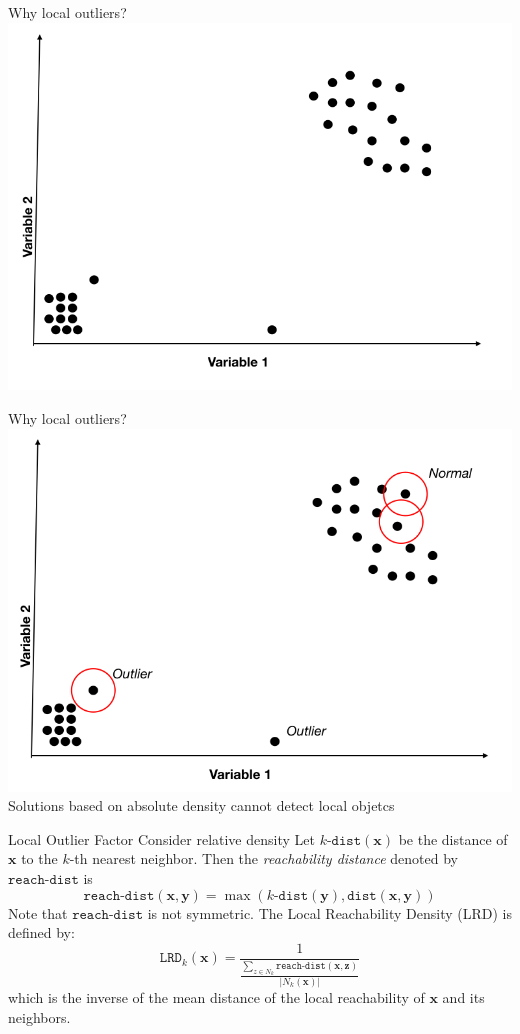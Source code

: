 \documentclass[10pt]{beamer}
\def\x{{\mathbf {x}}}
\newcommand{\vectorI}{\x}
\begin{document}
 





\begin{frame}{Why local outliers?}
\includegraphics[width=.75\textwidth]{NaiveOutlier}
\end{frame}

\begin{frame}{Why local outliers?}
\includegraphics[width=.75\textwidth]{NaiveOutlier2}
\\
\alert{Solutions based on absolute density cannot detect local objetcs}
\end{frame}

\begin{frame}{Local Outlier Factor}
Consider relative density
Let $k$-$\texttt{dist}(\vectorI)$ be the distance of $\vectorI$ to the $k$-th nearest neighbor.
Then the \emph{reachability distance} denoted by $\texttt{reach-dist}$ is
\begin{equation*}
\texttt{reach-dist}(\vectorI,\mathbf{y})=\max(k\texttt{-dist}(\mathbf{y}),\texttt{dist}(\vectorI,\mathbf{y}))
\end{equation*}
Note that $\texttt{reach-dist}$ is not symmetric.
The Local Reachability Density (LRD) is defined by:
\begin{equation*}
\texttt{LRD}_k(\vectorI)=\frac{1}{\frac{\sum_{z \in N_k}\texttt{reach-dist}(\vectorI,\mathbf{z})}{|N_k(\vectorI)|}}
\end{equation*}
which is the inverse of the mean distance of the local reachability of $\vectorI$ and its neighbors.
\end{frame}
\end{document}
